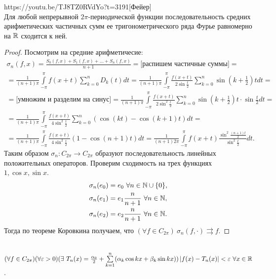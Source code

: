 \begin{linkthm}{https://youtu.be/TJ8TZ0RVdYo?t=3191}[Фейер]\ \\
	Для любой непрерывной $2\pi$-периодической функции последовательность средних арифметических частичных сумм ее тригонометрического ряда Фурье равномерно на $\mathbb{R}$ сходится к ней.
\end{linkthm}
\begin{proof}
	Посмотрим на средние арифметичесие:
	\begin{multline*}
		\sigma_n(f,x)=\frac{S_0(f,x)+S_1(f,x)+\ldots+S_n(f,x)}{n+1}=\text{[распишем частичные суммы]}=\\=\frac{1}{(n+1)\pi}\int\limits_{-\pi}^\pi f(x+t)\sum\limits_{k=0}^n D_k(t)dt=\frac{1}{(n+1)\pi}\int\limits_{-\pi}^\pi \frac{f(x+t)}{2\sin\frac{t}{2}}\sum\limits_{k=0}^n\sin\left(k+\frac{1}{2}\right)tdt=\\=\text{[умножим и разделим на синус]}=\frac{1}{(n+1)\pi}\int\limits_{-\pi}^\pi \frac{f(x+t)}{2\sin^2\frac{t}{2}}\sum\limits_{k=0}^n\sin\left(k+\frac{1}{2}\right)t\cdot \sin\frac{t}{2}dt=\\=\frac{1}{(n+1)\pi}\int\limits_{-\pi}^\pi \frac{f(x+t)}{4\sin^2\frac{t}{2}}\sum\limits_{k=0}^n\left(\cos(kt)-\cos(k+1)t\right)dt=\\=\frac{1}{(n+1)\pi}\int\limits_{-\pi}^\pi \frac{f(x+t)}{4\sin^2\frac{t}{2}}(1-\cos(n+1)t)dt=\frac{1}{(n+1)2\pi}\int\limits_{-\pi}^\pi f(x+t) \frac{\sin^2\frac{(n+1)t}{2}}{\sin^2\frac{t}{2}}dt .
	\end{multline*}
Таким образом $\sigma_n:C_{2\pi}\to C_{2\pi}$ образуют последовательность линейных положительных операторов. Проверим сходимость на трех функциях $1,\cos x,\sin x$.
\begin{align*}
	\sigma_n(e_0)&=e_0\ \forall n\in \mathbb{N}\cup\{0\},\\ \sigma_n(e_1)&=e_1\frac{n}{n+1}\ \forall n\in \mathbb{N},\\ \sigma_n(e_2)&=e_2\frac{n}{n+1}\ \forall n\in \mathbb{N}.
\end{align*}
Тогда по теореме Коровкина получаем, что $(\forall f\in C_{2\pi})\ \sigma_n(f,\cdot)\rightrightarrows f$.
\end{proof}

\begin{corollary}\ \\
	$(\forall f\in C_{2\pi})(\forall\varepsilon >0)(\exists\  T_n(x)=\frac{\alpha_0}{2}+\sum\limits_{k=1}^n(\alpha_k\cos kx+\beta_k\sin kx)) \left|f(x)-T_n(x)\right|<\varepsilon\  \forall x\in \mathbb{R}$.
\end{corollary}

